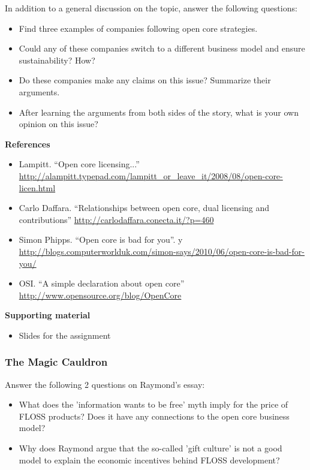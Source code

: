 \documentclass[a4paper]{article}
\begin{document}
In addition to a general discussion on the topic, answer the following questions:

\begin{itemize}
\item Find three examples of companies following open core strategies.
\item Could any of these companies switch to a different business model
  and ensure sustainability? How?
\item Do these companies make any claims on this issue? Summarize
  their arguments.
\item After learning the arguments from both sides of the story, what is your
  own opinion on this issue?
\end{itemize}

\textbf{References}

\begin{itemize}
\item Lampitt. ``Open core licensing...''
  \footnotesize{\url{http://alampitt.typepad.com/lampitt_or_leave_it/2008/08/open-core-licen.html}}
\item Carlo Daffara. ``Relationships between open core, dual licensing and contributions''
   \url{http://carlodaffara.conecta.it/?p=460}
 \item Simon Phipps. ``Open core is bad for you''.
y   \footnotesize{\url{http://blogs.computerworlduk.com/simon-says/2010/06/open-core-is-bad-for-you/}}
 \item OSI. ``A simple declaration about open core''
   \url{http://www.opensource.org/blog/OpenCore}
\end{itemize}

\textbf{Supporting material}

\begin{itemize}
\item Slides for the assignment
\end{itemize}

\subsubsection{The Magic Cauldron}
\label{sub:business-magic-cauldron}

Answer the following 2 questions on Raymond's essay:

\begin{itemize}
\item What does the 'information wants to be free' myth imply for the price of FLOSS products? Does it have any connections to the open core business model?
\item Why does Raymond argue that the so-called 'gift culture' is not a good model to explain the economic incentives behind FLOSS development?
\end{itemize}
\end{document}

